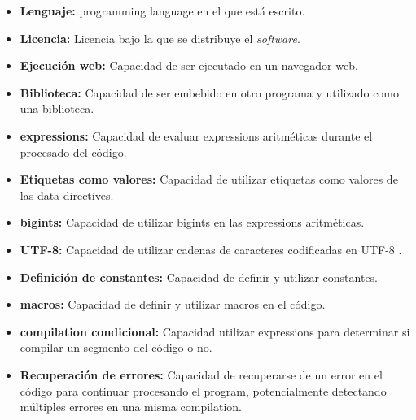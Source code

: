 \begin{itemize}
    \item \textbf{Lenguaje:} \Gls{programming language} en el que está escrito.
    \item \textbf{Licencia:} Licencia bajo la que se distribuye el
    \textit{software}.
    \item \textbf{Ejecución web:} Capacidad de ser ejecutado en un navegador
    web.
    \item \textbf{Biblioteca:} Capacidad de ser embebido en otro programa y
    utilizado como una biblioteca.
    \item \textbf{\Glspl{expression}:} Capacidad de evaluar \glspl{expression}
    aritméticas durante el procesado del código.
    \item \textbf{Etiquetas como valores:} Capacidad de utilizar etiquetas como
    valores de las \glspl{data directive}.
    \item \textbf{\Glspl{bigint}:} Capacidad de utilizar \glspl{bigint} en las
    \glspl{expression} aritméticas.
    \item \textbf{UTF-8:} Capacidad de utilizar cadenas de caracteres
    codificadas en UTF-8 \parencite{UTF-8}.
    \item \textbf{Definición de constantes:} Capacidad de definir y utilizar
    constantes.
    \item \textbf{\Glspl{macro}:} Capacidad de definir y utilizar \glspl{macro}
    en el código.
    \item \textbf{\Gls{compilation} condicional:} Capacidad utilizar
    \glspl{expression} para determinar si compilar un segmento del código o no.
    \item \textbf{Recuperación de errores:} Capacidad de recuperarse de un error
    en el código para continuar procesando el \gls{program}, potencialmente
    detectando múltiples errores en una misma \gls{compilation}.
\end{itemize}

